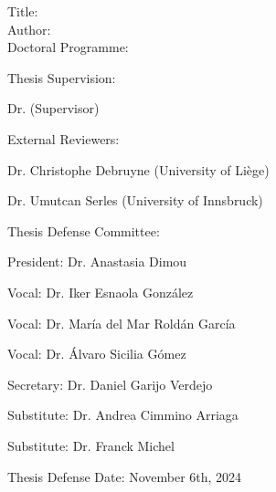 
\begin{spacing}{1.3}
Title: \thesisTitle \\
Author: \thesisAuthor \\
Doctoral Programme:	 \DoctoralProgramme
\end{spacing}
Thesis Supervision: 
\begin{mydescription}
    \item Dr. \supervisorDetails  (Supervisor)
\end{mydescription}

\vspace{10 mm}
External Reviewers: 
\begin{mydescription}
    \item Dr. Christophe Debruyne (University of Liège)
    \item Dr. Umutcan Serles (University of Innsbruck)
\end{mydescription}

\vspace{10 mm}

Thesis Defense Committee: %
\begin{mydescription}
    \item President:\hspace{3mm} Dr. Anastasia Dimou 
    \item Vocal:\hspace{10mm} Dr. Iker Esnaola González 
    \item Vocal:\hspace{10mm}  Dr. María del Mar Roldán García 
    \item Vocal:\hspace{10mm}  Dr. Álvaro Sicilia Gómez 
    \item Secretary:\hspace{2.8mm} Dr. Daniel Garijo Verdejo
    \item Substitute:\hspace{1.3mm} Dr. Andrea Cimmino Arriaga
    \item Substitute:\hspace{1.3mm} Dr. Franck Michel
\end{mydescription}


\vspace{10mm}


Thesis Defense Date: November 6th, 2024



\vspace{\fill}

